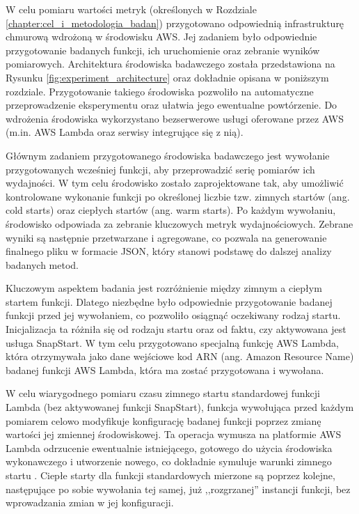 W celu pomiaru wartości metryk (określonych w Rozdziale \ref{chapter:cel_i_metodologia_badan}) przygotowano odpowiednią infrastrukturę chmurową wdrożoną w środowisku AWS.
Jej zadaniem było odpowiednie przygotowanie badanych funkcji, ich uruchomienie oraz zebranie wyników pomiarowych.
Architektura środowiska badawczego została przedstawiona na Rysunku \ref{fig:experiment_architecture} oraz dokładnie opisana w poniższym rozdziale.
Przygotowanie takiego środowiska pozwoliło na automatyczne przeprowadzenie eksperymentu oraz ułatwia jego ewentualne powtórzenie.
Do wdrożenia środowiska wykorzystano bezserwerowe usługi oferowane przez AWS (m.in. AWS Lambda oraz serwisy integrujące się z nią).

Głównym zadaniem przygotowanego środowiska badawczego jest wywołanie przygotowanych wcześniej funkcji, aby przeprowadzić serię pomiarów ich wydajności.
W tym celu środowisko zostało zaprojektowane tak, aby umożliwić kontrolowane wykonanie funkcji po określonej liczbie tzw. zimnych startów (ang. cold starts) oraz ciepłych startów (ang. warm starts). 
Po każdym wywołaniu, środowisko odpowiada za zebranie kluczowych metryk wydajnościowych. 
Zebrane wyniki są następnie przetwarzane i agregowane, co pozwala na generowanie finalnego pliku w formacie JSON, który stanowi podstawę do dalszej analizy badanych metod.

Kluczowym aspektem badania jest rozróżnienie między zimnym a ciepłym startem funkcji.
Dlatego niezbędne było odpowiednie przygotowanie badanej funkcji przed jej wywołaniem, co pozwoliło osiągnąć oczekiwany rodzaj startu.
Inicjalizacja ta różniła się od rodzaju startu oraz od faktu, czy aktywowana jest usługa SnapStart.
W tym celu przygotowano specjalną funkcję AWS Lambda, która otrzymywała jako dane wejściowe kod ARN (ang. Amazon Resource Name) badanej funkcji AWS Lambda, która ma zostać przygotowana i wywołana.

W celu wiarygodnego pomiaru czasu zimnego startu standardowej funkcji Lambda (bez aktywowanej funkcji SnapStart), funkcja wywołująca przed każdym pomiarem celowo modyfikuje konfigurację badanej funkcji poprzez zmianę wartości jej zmiennej środowiskowej. 
Ta operacja wymusza na platformie AWS Lambda odrzucenie ewentualnie istniejącego, gotowego do użycia środowiska wykonawczego i utworzenie nowego, co dokładnie symuluje warunki zimnego startu \cite{awsLambdaDocs}.
Ciepłe starty dla funkcji standardowych mierzone są poprzez kolejne, następujące po sobie wywołania tej samej, już ,,rozgrzanej'' instancji funkcji, bez wprowadzania zmian w jej konfiguracji.

